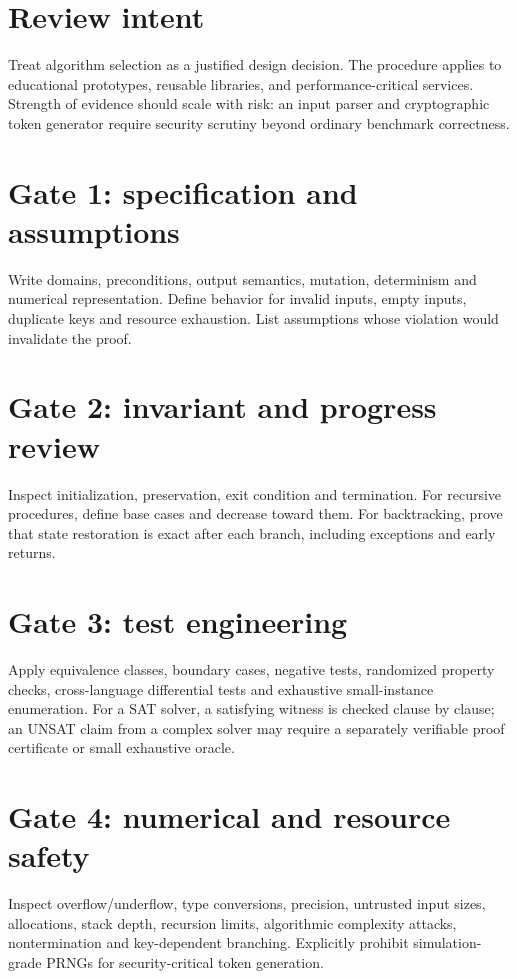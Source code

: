 \documentclass[11pt,letterpaper]{article}
\begin{document}
\tableofcontents
\clearpage
{}
\section{Review intent}
Treat algorithm selection as a justified design decision. The procedure applies to educational prototypes, reusable libraries, and performance-critical services. Strength of evidence should scale with risk: an input parser and cryptographic token generator require security scrutiny beyond ordinary benchmark correctness.
\section{Gate 1: specification and assumptions}
Write domains, preconditions, output semantics, mutation, determinism and numerical representation. Define behavior for invalid inputs, empty inputs, duplicate keys and resource exhaustion. List assumptions whose violation would invalidate the proof.
\section{Gate 2: invariant and progress review}
Inspect initialization, preservation, exit condition and termination. For recursive procedures, define base cases and decrease toward them. For backtracking, prove that state restoration is exact after each branch, including exceptions and early returns.
\section{Gate 3: test engineering}
Apply equivalence classes, boundary cases, negative tests, randomized property checks, cross-language differential tests and exhaustive small-instance enumeration. For a SAT solver, a satisfying witness is checked clause by clause; an UNSAT claim from a complex solver may require a separately verifiable proof certificate or small exhaustive oracle.
\section{Gate 4: numerical and resource safety}
Inspect overflow/underflow, type conversions, precision, untrusted input sizes, allocations, stack depth, recursion limits, algorithmic complexity attacks, nontermination and key-dependent branching. Explicitly prohibit simulation-grade PRNGs for security-critical token generation.
\end{document}
